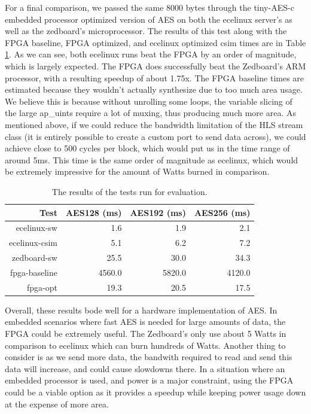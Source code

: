 For a final comparison, we passed the same 8000 bytes through the tiny-AES-c embedded processor optimized version of AES on both the ecelinux server's as well as the zedboard's microprocessor. The results of this test along with the FPGA baseline, FPGA optimized, and ecelinux optimized csim times are in Table \ref{table:aestime}. As we can see, both ecelinux runs beat the FPGA by an order of magnitude, which is largely expected. The FPGA does successfully beat the Zedboard's ARM processor, with a resulting speedup of about 1.75x. The FPGA baseline times are estimated because they wouldn't actually synthesize due to too much area usage. We believe this is because without unrolling some loops, the variable slicing of the large ap\_uints require a lot of muxing, thus producing much more area. As mentioned above, if we could reduce the bandwidth limitation of the HLS stream class (it is entirely possible to create a custom port to send data across), we could achieve close to 500 cycles per block, which would put us in the time range of around 5ms. This time is the same order of magnitude as ecelinux, which would be extremely impressive for the amount of Watts burned in comparison. 

\begin{table}[h]
\begin{center}
\begin{tabular}{@{}r r r r@{}}
\toprule
Test & AES128 (ms) & AES192 (ms) & AES256 (ms) \\ \midrule
ecelinux-sw & 1.6 & 1.9 & 2.1 \\
ecelinux-csim & 5.1 & 6.2 & 7.2 \\
zedboard-sw & 25.5 & 30.0 & 34.3 \\
fpga-baseline & 4560.0 & 5820.0 & 4120.0 \\
fpga-opt & 19.3 & 20.5 & 17.5 \\ \bottomrule
\end{tabular}
\label{table:aestime}
\caption{The results of the tests run for evaluation.}
\end{center}
\end{table}

Overall, these results bode well for a hardware implementation of AES. In embedded scenarios where fast AES is needed for large amounts of data, the FPGA could be extremely useful. The Zedboard's only use about 5 Watts in comparison to ecelinux which can burn hundreds of Watts. Another thing to consider is as we send more data, the bandwith required to read and send this data will increase, and could cause slowdowns there. In a situation where an embedded processor is used, and power is a major constraint, using the FPGA could be a viable option as it provides a speedup while keeping power usage down at the expense of more area. 